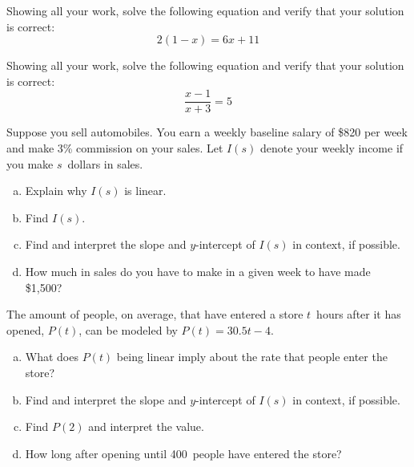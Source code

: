 \documentclass[11pt,letterpaper]{article}
\begin{document}
 Showing all your work, solve the following equation and verify that your solution is correct:
	\[
	2(1 - x)= 6x + 11
	\]



\newpage



 Showing all your work, solve the following equation and verify that your solution is correct:
	\[
	\dfrac{x - 1}{x + 3}= 5
	\]



\newpage



 Suppose you sell automobiles. You earn a weekly baseline salary of \$820 per week and make 3\% commission on your sales. Let $I(s)$ denote your weekly income if you make $s$~dollars in sales. 
	\begin{enumerate}[(a)]
	\item Explain why $I(s)$ is linear. 
	\item Find $I(s)$.
	\item Find and interpret the slope and $y$-intercept of $I(s)$ in context, if possible. 
	\item How much in sales do you have to make in a given week to have made \$1,500?
	\end{enumerate}



\newpage



 The amount of people, on average, that have entered a store $t$~hours after it has opened, $P(t)$, can be modeled by $P(t)= 30.5t - 4$. 
	\begin{enumerate}[(a)]
	\item What does $P(t)$ being linear imply about the rate that people enter the store?
	\item Find and interpret the slope and $y$-intercept of $I(s)$ in context, if possible.
	\item Find $P(2)$ and interpret the value. 
	\item How long after opening until 400~people have entered the store? 
	\end{enumerate}
\end{document}
